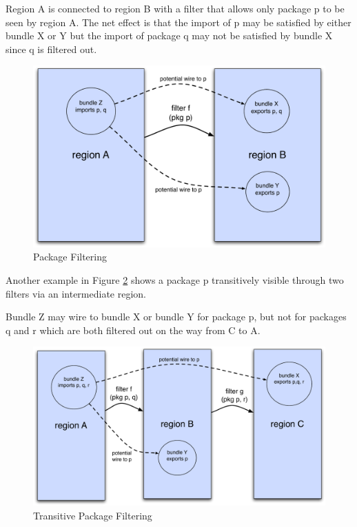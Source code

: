 \documentclass[a4paper,9pt]{article}
\begin{document}
Region A is connected to region B with a filter that allows only package p to be seen by region A.
The net effect is that the import of p may be satisfied by either bundle X or Y but the import of package q may not
be satisfied by bundle X since q is filtered out.
\begin{figure}[h!]
\begin{center}
\includegraphics*[scale=0.4]{package-filtering.pdf}
\caption{Package Filtering \label{fig:pfilt}}
\end{center}
\end{figure}

Another example in Figure \ref{fig:tpfilt} shows a package p transitively visible through two filters via an
intermediate region.

Bundle Z may wire to bundle X or bundle Y for package p, but not for packages q and r which are both
filtered out on the way from C to A.
\begin{figure}[h!]
\begin{center}
\includegraphics*[scale=0.4]{transitive-package-filtering.pdf}
\caption{Transitive Package Filtering \label{fig:tpfilt}}
\end{center}
\end{figure}
\end{document}
